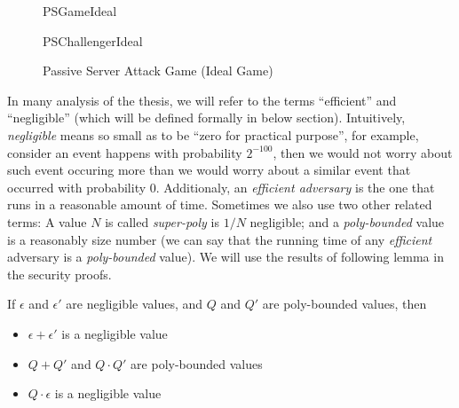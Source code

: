 \begin{figure}[!h]
  \centering
  \begin{center}
    \begin{bbrenv}{PSGameIdeal}
      \begin{bbrbox}[name=Adversary, minheight=2cm]
        
      \end{bbrbox}
      \begin{bbrchallenger}{PSChallengerIdeal}
        \begin{bbrbox}[name=Challenger]
        \end{bbrbox}
      \end{bbrchallenger}
    \end{bbrenv}
  \end{center}
  \caption{Passive Server Attack Game (Ideal Game)}
  \label{fig:passiveServerGameIdeal}
\end{figure}

In many analysis of the thesis, we will refer to the terms ``efficient'' and
``negligible'' (which will be defined formally in below section). Intuitively,
\textit{negligible} means so small as to be ``zero for practical purpose'', for
example, consider an event happens with probability \(2^{-100}\), then we would
not worry about such event occuring more than we would worry about a similar
event that occurred with probability 0. Additionaly, an \textit{efficient
  adversary} is the one that runs in a reasonable amount of time. Sometimes we
also use two other related terms: A value \(N\) is called \textit{super-poly} is
\(1/N\) negligible; and a \textit{poly-bounded} value is a reasonably size
number (we can say that the running time of any \textit{efficient} adversary is
a \textit{poly-bounded} value). We will use the results of following lemma in
the security proofs.
\begin{lemma}
  If \(\epsilon\) and \(\epsilon'\) are negligible values, and \(Q\) and \(Q'\)
  are poly-bounded values, then
  \begin{itemize}
  \item \(\epsilon + \epsilon'\) is a negligible value
  \item \(Q + Q'\) and \(Q \cdot Q'\) are poly-bounded values
  \item \(Q \cdot \epsilon\) is a negligible value
  \end{itemize}
\end{lemma}


